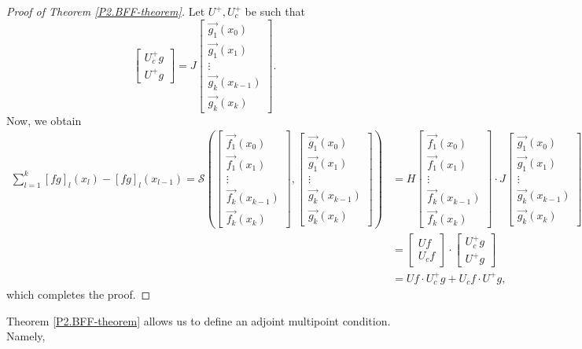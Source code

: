 \documentclass[10pt,reqno,oneside,a4paper]{article}
\begin{document}
\begin{proof}[Proof of Theorem \ref{P2.BFF-theorem}]
Let $U^+, U^+_c$ be such that 
\[
\begin{bmatrix}
U^+_cg \\
U^+ g
\end{bmatrix} = J\begin{bmatrix}
\vec{g_1}(x_{0})  \\
\vec{g_1}(x_1) \\
\vdots \\
\vec{g_k}(x_{k-1})  \\
\vec{g_k}(x_k)
\end{bmatrix}.
\]
Now, we obtain 
\begin{align*}
\sum_{l=1}^{k} [fg]_l(x_l) - [fg]_l(x_{l-1})  = \mathcal{S} \left( \begin{bmatrix}
\vec{f_1}(x_{0})  \\
\vec{f_1}(x_1) \\
\vdots \\
\vec{f_k}(x_{k-1})  \\
\vec{f_k}(x_k)
\end{bmatrix},  
\begin{bmatrix}
\vec{g_1}(x_{0})  \\
\vec{g_1}(x_1) \\
\vdots \\
\vec{g_k}(x_{k-1})  \\
\vec{g_k}(x_k)
\end{bmatrix}
\right)
&= H
\begin{bmatrix}
\vec{f_1}(x_{0})  \\
\vec{f_1}(x_1) \\
\vdots \\
\vec{f_k}(x_{k-1})  \\
\vec{f_k}(x_k)
\end{bmatrix} \cdot 
J\begin{bmatrix}
\vec{g_1}(x_{0})  \\
\vec{g_1}(x_1) \\
\vdots \\
\vec{g_k}(x_{k-1})  \\
\vec{g_k}(x_k)
\end{bmatrix} \\
&= \begin{bmatrix}
Uf \\
U_c f
\end{bmatrix} \cdot 
\begin{bmatrix}
U^+_cg \\
U^+ g
\end{bmatrix} \\
&=  Uf\cdot U^+_c g + U_c f \cdot U^+ g,
\end{align*}
which completes the proof.
\end{proof}
Theorem \ref{P2.BFF-theorem} allows us to define an adjoint multipoint condition. Namely, 
\end{document}
